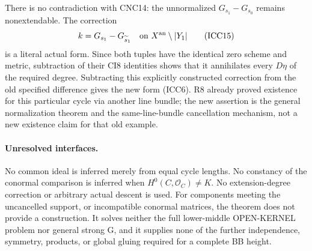 There is no contradiction with CNC14: the unnormalized
$G_{s_1}-G_{s_0}$ remains nonextendable.  The correction
\[
                 k=G_{s_1}-G_{\widetilde s_1}
                         \quad\text{on }X^{\rm an}\setminus|Y_1|
 \tag{ICC15}
\]
is a literal actual form.  Since both tuples have the identical
zero scheme and metric, subtraction of their CI8 identities
shows that it annihilates every $D\eta$ of the required degree.
Subtracting this explicitly constructed correction from the
old specified difference gives the new form (ICC6).
R8 already proved existence for this particular cycle via
another line bundle; the new assertion is the general
normalization theorem and the same-line-bundle cancellation
mechanism, not a new existence claim for that old example.

\paragraph{Unresolved interfaces.}
No common ideal is inferred merely from equal cycle lengths.
No constancy of the conormal comparison is inferred when
$H^0(C,\mathcal O_C)\ne K$.
No extension-degree correction or arbitrary actual descent
is used.  For components meeting the uncancelled support,
or incompatible conormal matrices, the theorem does not
provide a construction.  It solves neither the full
lower-middle OPEN-KERNEL problem nor general strong G,
and it supplies none of the further independence, symmetry,
products, or global gluing required for a complete BB height.
